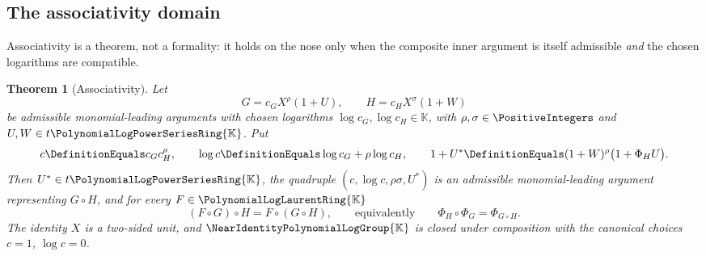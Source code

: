 \documentclass[11pt,oneside]{article}
\theoremstyle{plain}
\newtheorem{theorem}{Theorem}[section]
\theoremstyle{definition}
\theoremstyle{remark}
\newcommand{\K}{\mathbb{K}}
\newcommand{\PLpow}{\PolynomialLogPowerSeriesRing{\K}}   %
\newcommand{\PLlau}{\PolynomialLogLaurentRing{\K}}       %
\newcommand{\Gnear}{\NearIdentityPolynomialLogGroup{\K}} %
\newcommand{\compose}{\mathbin{\circ}}
\begin{document}
\subsection{The associativity domain}
\label{plt:sec:cmp-associativity}

Associativity is a theorem, not a formality: it holds on the nose only when
the composite inner argument is itself admissible \emph{and} the chosen
logarithms are compatible.

\begin{theorem}[Associativity]\label{plt:thm:cmp-associativity}
Let
\[
 G=c_{G}X^{\rho}(1+U),
 \qquad
 H=c_{H}X^{\sigma}(1+W)
\]
be admissible monomial-leading arguments with chosen logarithms
\(\log c_{G},\log c_{H}\in\K\), with
\(\rho,\sigma\in\PositiveIntegers\) and \(U,W\in t\PLpow\).  Put
\begin{equation}\label{plt:eq:cmp-composed-inner}
 c\DefinitionEquals c_{G}c_{H}^{\rho},
 \qquad
 \log c\DefinitionEquals\log c_{G}+\rho\log c_{H},
 \qquad
 1+U^{\ast}\DefinitionEquals(1+W)^{\rho}\bigl(1+\Phi_{H}U\bigr).
\end{equation}
Then \(U^{\ast}\in t\PLpow\), the quadruple
\((c,\log c,\rho\sigma,U^{\ast})\) is an admissible monomial-leading argument
representing \(G\compose H\), and for every \(F\in\PLlau\)
\begin{equation}\label{plt:eq:cmp-associativity}
 (F\compose G)\compose H=F\compose(G\compose H),
 \qquad\text{equivalently}\qquad
 \Phi_{H}\circ\Phi_{G}=\Phi_{G\compose H}.
\end{equation}
The identity \(X\) is a two-sided unit, and \(\Gnear\) is closed under
composition with the canonical choices \(c=1\), \(\log c=0\).
\end{theorem}
\end{document}

